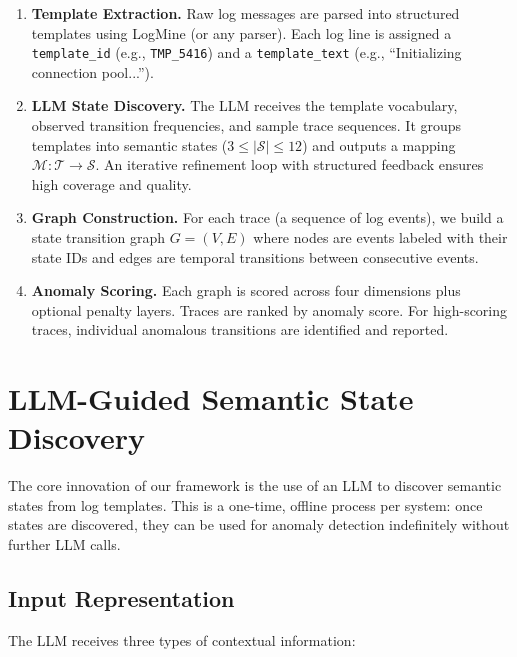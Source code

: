 \documentclass[11pt]{article}
\begin{document}
\begin{enumerate}[leftmargin=*,itemsep=2pt]
    \item \textbf{Template Extraction.} Raw log messages are parsed into structured templates using LogMine (or any parser). Each log line is assigned a \texttt{template\_id} (e.g., \texttt{TMP\_5416}) and a \texttt{template\_text} (e.g., ``Initializing connection pool...'').
    
    \item \textbf{LLM State Discovery.} The LLM receives the template vocabulary, observed transition frequencies, and sample trace sequences. It groups templates into semantic states ($3 \leq |\mathcal{S}| \leq 12$) and outputs a mapping $\mathcal{M}: \mathcal{T} \rightarrow \mathcal{S}$. An iterative refinement loop with structured feedback ensures high coverage and quality.
    
    \item \textbf{Graph Construction.} For each trace (a sequence of log events), we build a state transition graph $G = (V, E)$ where nodes are events labeled with their state IDs and edges are temporal transitions between consecutive events.
    
    \item \textbf{Anomaly Scoring.} Each graph is scored across four dimensions plus optional penalty layers. Traces are ranked by anomaly score. For high-scoring traces, individual anomalous transitions are identified and reported.
\end{enumerate}

\section{LLM-Guided Semantic State Discovery}
\label{sec:discovery}

The core innovation of our framework is the use of an LLM to discover semantic states from log templates. This is a one-time, offline process per system: once states are discovered, they can be used for anomaly detection indefinitely without further LLM calls.

\subsection{Input Representation}

The LLM receives three types of contextual information:
\end{document}
